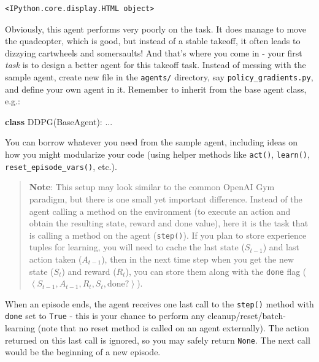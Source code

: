 \documentclass[11pt]{article}
\newenvironment{Shaded}{}{}
\newcommand{\KeywordTok}[1]{\textcolor[rgb]{0.00,0.44,0.13}{\textbf{{#1}}}}
\newcommand{\NormalTok}[1]{{#1}}
\begin{document}
    
    \begin{verbatim}
<IPython.core.display.HTML object>
    \end{verbatim}

    
    Obviously, this agent performs very poorly on the task. It does manage
to move the quadcopter, which is good, but instead of a stable takeoff,
it often leads to dizzying cartwheels and somersaults! And that's where
you come in - your first \emph{task} is to design a better agent for
this takeoff task. Instead of messing with the sample agent, create new
file in the \texttt{agents/} directory, say
\texttt{policy\_gradients.py}, and define your own agent in it. Remember
to inherit from the base agent class, e.g.:

\begin{Shaded}
\begin{Highlighting}[]
\KeywordTok{class}\NormalTok{ DDPG(BaseAgent):}
\NormalTok{    ...}
\end{Highlighting}
\end{Shaded}

You can borrow whatever you need from the sample agent, including ideas
on how you might modularize your code (using helper methods like
\texttt{act()}, \texttt{learn()}, \texttt{reset\_episode\_vars()},
etc.).

\begin{quote}
\textbf{Note}: This setup may look similar to the common OpenAI Gym
paradigm, but there is one small yet important difference. Instead of
the agent calling a method on the environment (to execute an action and
obtain the resulting state, reward and done value), here it is the task
that is calling a method on the agent (\texttt{step()}). If you plan to
store experience tuples for learning, you will need to cache the last
state (\(S_{t-1}\)) and last action taken (\(A_{t-1}\)), then in the
next time step when you get the new state (\(S_t\)) and reward
(\(R_t\)), you can store them along with the \texttt{done} flag
(\(\left\langle S_{t-1}, A_{t-1}, R_t, S_t, \mathrm{done?}\right\rangle\)).
\end{quote}

When an episode ends, the agent receives one last call to the
\texttt{step()} method with \texttt{done} set to \texttt{True} - this is
your chance to perform any cleanup/reset/batch-learning (note that no
reset method is called on an agent externally). The action returned on
this last call is ignored, so you may safely return \texttt{None}. The
next call would be the beginning of a new episode.
\end{document}
